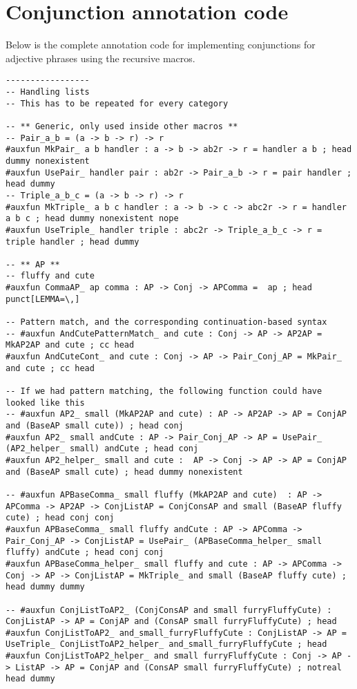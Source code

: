 \chapter{Conjunction annotation code}\label{appendix:conjunctions}

Below is the complete annotation code for implementing conjunctions for adjective phrases using the recursive macros.

\begin{lstlisting}
-----------------
-- Handling lists
-- This has to be repeated for every category

-- ** Generic, only used inside other macros **
-- Pair_a_b = (a -> b -> r) -> r
#auxfun MkPair_ a b handler : a -> b -> ab2r -> r = handler a b ; head dummy nonexistent
#auxfun UsePair_ handler pair : ab2r -> Pair_a_b -> r = pair handler ; head dummy
-- Triple_a_b_c = (a -> b -> r) -> r
#auxfun MkTriple_ a b c handler : a -> b -> c -> abc2r -> r = handler a b c ; head dummy nonexistent nope
#auxfun UseTriple_ handler triple : abc2r -> Triple_a_b_c -> r = triple handler ; head dummy

-- ** AP **
-- fluffy and cute
#auxfun CommaAP_ ap comma : AP -> Conj -> APComma =  ap ; head punct[LEMMA=\,]

-- Pattern match, and the corresponding continuation-based syntax
-- #auxfun AndCutePatternMatch_ and cute : Conj -> AP -> AP2AP = MkAP2AP and cute ; cc head
#auxfun AndCuteCont_ and cute : Conj -> AP -> Pair_Conj_AP = MkPair_ and cute ; cc head

-- If we had pattern matching, the following function could have looked like this
-- #auxfun AP2_ small (MkAP2AP and cute) : AP -> AP2AP -> AP = ConjAP and (BaseAP small cute)) ; head conj
#auxfun AP2_ small andCute : AP -> Pair_Conj_AP -> AP = UsePair_ (AP2_helper_ small) andCute ; head conj
#auxfun AP2_helper_ small and cute :  AP -> Conj -> AP -> AP = ConjAP and (BaseAP small cute) ; head dummy nonexistent

-- #auxfun APBaseComma_ small fluffy (MkAP2AP and cute)  : AP -> APComma -> AP2AP -> ConjListAP = ConjConsAP and small (BaseAP fluffy cute) ; head conj conj
#auxfun APBaseComma_ small fluffy andCute : AP -> APComma -> Pair_Conj_AP -> ConjListAP = UsePair_ (APBaseComma_helper_ small fluffy) andCute ; head conj conj
#auxfun APBaseComma_helper_ small fluffy and cute : AP -> APComma -> Conj -> AP -> ConjListAP = MkTriple_ and small (BaseAP fluffy cute) ; head dummy dummy

-- #auxfun ConjListToAP2_ (ConjConsAP and small furryFluffyCute) : ConjListAP -> AP = ConjAP and (ConsAP small furryFluffyCute) ; head
#auxfun ConjListToAP2_ and_small_furryFluffyCute : ConjListAP -> AP = UseTriple_ ConjListToAP2_helper_ and_small_furryFluffyCute ; head
#auxfun ConjListToAP2_helper_ and small furryFluffyCute : Conj -> AP -> ListAP -> AP = ConjAP and (ConsAP small furryFluffyCute) ; notreal head dummy


\end{lstlisting}
